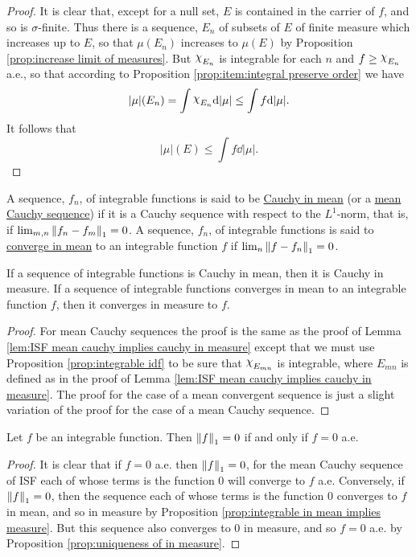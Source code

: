 \begin{proof}
It is clear that, except for a null set, $E$ is contained in the carrier of $f$, and so is $\sigma$-finite. Thus there is a sequence, $E_n$ of subsets of $E$ of finite measure which increases up to $E$, so that $\mu(E_n)$ increases to $\mu(E)$ by Proposition \ref{prop:increase limit of measures}. But $\idf{E_n}$ is integrable for each $n$ and $f\geq\idf{E_n}$ a.e., so that according to Proposition \ref{prop:item:integral preserve order} we have $$|\mu|(E_n)=\int\idf{E_n}\dd|\mu|\leq\int f\dd|\mu|.$$ It follows that $$|\mu|(E)\leq\int f\dd|\mu|.$$
\end{proof}

\begin{definition}
A sequence, $f_n$, of integrable functions is said to be \underline{Cauchy in mean} (or a \underline{mean Cauchy sequence}) if it is a Cauchy sequence with respect to the $L^1$-norm, that is, if $\lim_{m, n}\norm{f_n-f_m}_1=0$. A sequence, $f_n$, of integrable functions is said to \underline{converge in mean} to an integrable function $f$ if $\lim_n\norm{f-f_n}_1=0$.
\end{definition}

\begin{proposition}
\label{prop:integrable in mean implies measure}
If a sequence of integrable functions is Cauchy in mean, then it is Cauchy in measure. If a sequence of integrable functions converges in mean to an integrable function $f$, then it converges in measure to $f$.
\end{proposition}

\begin{proof}
For mean Cauchy sequences the proof is the same as the proof of Lemma \ref{lem:ISF mean cauchy implies cauchy in measure} except that we must use Proposition \ref{prop:integrable idf} to be sure that $\idf{E_{mn}}$ is integrable, where $E_{mn}$ is defined as in the proof of Lemma \ref{lem:ISF mean cauchy implies cauchy in measure}. The proof for the case of a mean convergent sequence is just a slight variation of the proof for the case of a mean Cauchy sequence.
\end{proof}

\begin{proposition}
\label{prop:zero L1 norm}
Let $f$ be an integrable function. Then $\norm{f}_1=0$ if and only if $f=0$ a.e.
\end{proposition}

\begin{proof}
It is clear that if $f=0$ a.e. then $\norm{f}_1=0$, for the mean Cauchy sequence of ISF each of whose terms is the function $0$ will converge to $f$ a.e. Conversely, if $\norm{f}_1=0$, then the sequence each of whose terms is the function 0 converges to $f$ in mean, and so in measure by Proposition \ref{prop:integrable in mean implies measure}. But this sequence also converges to $0$ in measure, and so $f=0$ a.e. by Proposition \ref{prop:uniqueness of in measure}.
\end{proof}


